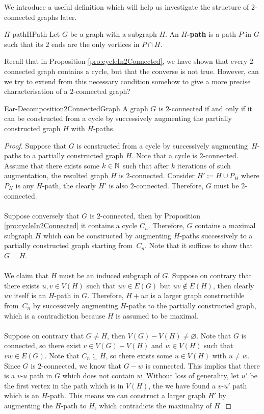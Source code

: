 \documentclass[math]{amznotes}
\theoremstyle{remark}
\newcommand{\0}{\mathbf{0}}
\newcommand{\1}{\mathbf{1}}
\begin{document}
We introduce a useful definition which will help us investigate the structure of $2$-connected graphs later.
\begin{dfnbox}{$H$-path}{HPath}
    Let $G$ be a graph with a subgraph $H$. An {\color{red} \textbf{$H$-path}} is a path $P$ in $G$ such that its $2$ ends are the only vertices in $P \cap H$.
\end{dfnbox}
Recall that in Proposition \ref{pro:cycleIn2Connected}, we have shown that every $2$-connected graph contains a cycle, but that the converse is not true. However, can we try to extend from this necessary condition somehow to give a more precise characterisation of a $2$-connected graph?
\begin{thmbox}{Ear-Decomposition}{2ConnectedGraph}
    A graph $G$ is $2$-connected if and only if it can be constructed from a cycle by successively augmenting the partially constructed graph $H$ with $H$-paths.
    \tcblower
    \begin{proof}
        Suppose that $G$ is constructed from a cycle by successively augmenting~$H$-paths to a partially constructed graph $H$. Note that a cycle is $2$-connected. Assume that there exists some $k \in \mathbb{N}$ such that after $k$ iterations of such augmentation, the resulted graph $H$ is $2$-connected. Consider $H' \coloneqq H \cup P_H$ where $P_H$ is any $H$-path, the clearly $H'$ is also $2$-connected. Therefore, $G$ must be $2$-connected.
        \\\\
        Suppose conversely that $G$ is $2$-connected, then by Proposition \ref{pro:cycleIn2Connected} it contains a cycle $C_n$. Therefore, $G$ contains a maximal subgraph $H$ which can be constructed by augmenting $H$-paths successively to a partially constructed graph starting from~$C_n$. Note that it suffices to show that $G = H$.
        \\\\
        We claim that $H$ must be an induced subgraph of $G$. Suppose on contrary that there exists $u, v \in V(H)$ such that $uv \in E(G)$ but $uv \notin E(H)$, then clearly $uv$ itself is an $H$-path in $G$. Therefore, $H + uv$ is a larger graph constructible from~$C_n$ by successively augmenting $H$-paths to the partially constructed graph, which is a contradiction because $H$ is assumed to be maximal.
        \\\\
        Suppose on contrary that $G \neq H$, then $V(G) - V(H) \neq \varnothing$. Note that $G$ is connected, so there exist $v \in V(G) - V(H)$ and $w \in V(H)$ such that $vw \in E(G)$. Note that $C_n \subseteq H$, so there exists some $u \in V(H)$ with $u \neq w$. Since $G$ is $2$-connected, we know that $G - w$ is connected. This implies that there is a $v$-$u$ path in $G$ which does not contain $w$. Without loss of generality, let $u'$ be the first vertex in the path which is in $V(H)$, the we have found a $v$-$u'$ path which is an $H$-path. This means we can construct a larger graph $H'$ by augmenting the $H$-path to $H$, which contradicts the maximality of $H$.
    \end{proof}
\end{thmbox}
\end{document}
